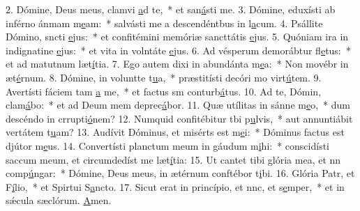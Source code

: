 2. Dómine, Deus meus, clamvi \uline{a}d te,~* et san\uline{á}sti me.
3. Dómine, eduxísti ab inférno ánmam m\uline{e}am:~* salvásti me a descendéntbus in l\uline{a}cum.
4. Psállite Dómino, sncti \uline{e}jus:~* et confitémini memóriæ sancttátis \uline{e}jus.
5. Quóniam ira in indignatine \uline{e}jus:~* et vita in volntáte \uline{e}jus.
6. Ad vésperum demorábtur fl\uline{e}tus:~* et ad matutnum læt\uline{í}tia.
7. Ego autem dixi in abundánta m\uline{e}a:~* Non movébr in æt\uline{é}rnum.
8. Dómine, in voluntte t\uline{u}a,~* præstitísti decóri mo virt\uline{ú}tem.
9. Avertísti fáciem tam \uline{a} me,~* et factus sm conturb\uline{á}tus.
10. Ad te, Dómin, clam\uline{á}bo:~* et ad Deum mem deprec\uline{á}bor.
11. Quæ utílitas in sánne m\uline{e}o,~* dum descéndo in crrupti\uline{ó}nem?
12. Numquid confitébitur tbi p\uline{u}lvis,~* aut annuntiábit vertátem t\uline{u}am?
13. Audívit Dóminus, et misérts est m\uline{e}i:~* Dóminus factus est djútor m\uline{e}us.
14. Convertísti planctum meum in gáudum m\uline{i}hi:~* conscidísti saccum meum, et circumdedíst me læt\uline{í}tia:
15. Ut cantet tibi glória mea, et nn comp\uline{ú}ngar:~* Dómine, Deus meus, in ætérnum conftébor t\uline{i}bi.
16. Glória Patr, et F\uline{í}lio,~* et Spirtui S\uline{a}ncto.
17. Sicut erat in princípio, et nnc, et s\uline{e}mper,~* et in sǽcula sæclórum. \uline{A}men.
